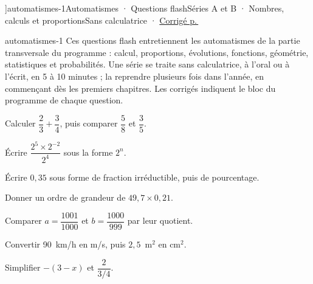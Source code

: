 \editionPage[\pdfbookmark[0]{Automatismes : questions flash}{bm-automatismes-1-parent}]{automatismes-1}{Automatismes · Questions flash}{Séries A et B · Nombres, calculs et proportions}{Sans calculatrice · \hyperref[automatismes-cor-1]{Corrigé p.\,\pageref*{automatismes-cor-1}}}
\begin{blocEdition}{automatismes-1}
Ces questions flash entretiennent les automatismes de la partie transversale du programme : calcul, proportions, évolutions, fonctions, géométrie, statistiques et probabilités. Une série se traite sans calculatrice, à l’oral ou à l’écrit, en 5 à 10 minutes ; la reprendre plusieurs fois dans l’année, en commençant dès les premiers chapitres. Les corrigés indiquent le bloc du programme de chaque question.
\begin{deuxcolonnes}\begin{questions}
\item \begin{minipage}[t]{\linewidth}\raggedright\leavevmode Calculer $\dfrac23+\dfrac34$, puis comparer $\dfrac58$ et $\dfrac35$.\end{minipage}
\item \begin{minipage}[t]{\linewidth}\raggedright\leavevmode Écrire $\dfrac{2^5\times2^{-2}}{2^4}$ sous la forme $2^n$.\end{minipage}
\item \begin{minipage}[t]{\linewidth}\raggedright\leavevmode Écrire $0{,}35$ sous forme de fraction irréductible, puis de pourcentage.\end{minipage}
\item \begin{minipage}[t]{\linewidth}\raggedright\leavevmode Donner un ordre de grandeur de $49{,}7\times0{,}21$.\end{minipage}
\item \begin{minipage}[t]{\linewidth}\raggedright\leavevmode Comparer $a=\dfrac{1001}{1000}$ et $b=\dfrac{1000}{999}$ par leur quotient.\end{minipage}
\item \begin{minipage}[t]{\linewidth}\raggedright\leavevmode Convertir 90~km/h en m/s, puis $2{,}5$~m$^2$ en cm$^2$.\end{minipage}
\item \begin{minipage}[t]{\linewidth}\raggedright\leavevmode Simplifier $-(3-x)$ et $\dfrac2{3/4}$.\end{minipage}

\end{questions}
\end{deuxcolonnes}
\end{blocEdition}
